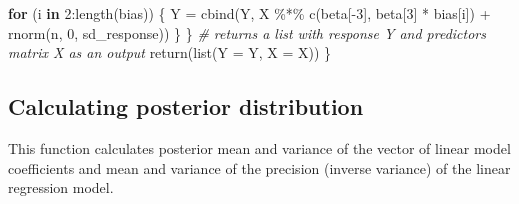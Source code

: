 \documentclass[
]{article}
\newenvironment{Shaded}{\begin{snugshade}}{\end{snugshade}}
\newcommand{\AttributeTok}[1]{\textcolor[rgb]{0.77,0.63,0.00}{#1}}
\newcommand{\CommentTok}[1]{\textcolor[rgb]{0.56,0.35,0.01}{\textit{#1}}}
\newcommand{\ControlFlowTok}[1]{\textcolor[rgb]{0.13,0.29,0.53}{\textbf{#1}}}
\newcommand{\DecValTok}[1]{\textcolor[rgb]{0.00,0.00,0.81}{#1}}
\newcommand{\FunctionTok}[1]{\textcolor[rgb]{0.00,0.00,0.00}{#1}}
\newcommand{\NormalTok}[1]{#1}
\newcommand{\OtherTok}[1]{\textcolor[rgb]{0.56,0.35,0.01}{#1}}
\newcommand{\SpecialCharTok}[1]{\textcolor[rgb]{0.00,0.00,0.00}{#1}}
\begin{document}
\begin{Shaded}
\begin{Highlighting}[]
        \ControlFlowTok{for}\NormalTok{ (i }\ControlFlowTok{in} \DecValTok{2}\SpecialCharTok{:}\FunctionTok{length}\NormalTok{(bias)) \{}
\NormalTok{            Y }\OtherTok{=} \FunctionTok{cbind}\NormalTok{(Y, X }\SpecialCharTok{\%*\%} \FunctionTok{c}\NormalTok{(beta[}\SpecialCharTok{{-}}\DecValTok{3}\NormalTok{], beta[}\DecValTok{3}\NormalTok{] }\SpecialCharTok{*}\NormalTok{ bias[i]) }\SpecialCharTok{+} \FunctionTok{rnorm}\NormalTok{(n, }\DecValTok{0}\NormalTok{, sd\_response))}
\NormalTok{        \}}
\NormalTok{    \}}
    \CommentTok{\# returns a list with response Y and predictors matrix X as an output}
    \FunctionTok{return}\NormalTok{(}\FunctionTok{list}\NormalTok{(}\AttributeTok{Y =}\NormalTok{ Y, }\AttributeTok{X =}\NormalTok{ X))}
\NormalTok{\}}
\end{Highlighting}
\end{Shaded}

\hypertarget{calculating-posterior-distribution}{%
\subsection{Calculating posterior
distribution}\label{calculating-posterior-distribution}}

This function calculates posterior mean and variance of the vector of
linear model coefficients and mean and variance of the precision
(inverse variance) of the linear regression model.
\end{document}
